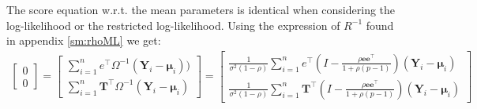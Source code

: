 \documentclass[12pt]{article}
\newcommand\Ve{\mathbf{e}}
\newcommand\VT{\mathbf{T}}
\newcommand\VY{\mathbf{Y}}
\newcommand\Vmu{\boldsymbol{\mu}}
\newcommand\trans[1]{{#1}^\intercal}%
\begin{document}
The score equation w.r.t. the mean parameters is identical when
considering the log-likelihood or the restricted log-likelihood. Using
the expression of \(R^{-1}\) found in appendix \ref{sm:rhoML} we get:
\begin{align*}
\begin{bmatrix}
0 \\ 0
\end{bmatrix}
=
\begin{bmatrix}
\sum_{i=1}^n \trans{e}\Omega^{-1} (\VY_i-\Vmu_i)) \\
\sum_{i=1}^n \trans{\VT}\Omega^{-1} (\VY_i-\Vmu_i)
\end{bmatrix}
=
\begin{bmatrix}
\frac{1}{\sigma^2(1-\rho)}\sum_{i=1}^n \trans{e}\left(I- \frac{\rho \Ve \trans{\Ve}}{1+\rho(p-1)}\right) (\VY_i-\Vmu_i) \\
\frac{1}{\sigma^2(1-\rho)}\sum_{i=1}^n \trans{\VT}\left(I- \frac{\rho \Ve \trans{\Ve}}{1+\rho(p-1)}\right) (\VY_i-\Vmu_i)
\end{bmatrix}
\end{align*}
\end{document}
